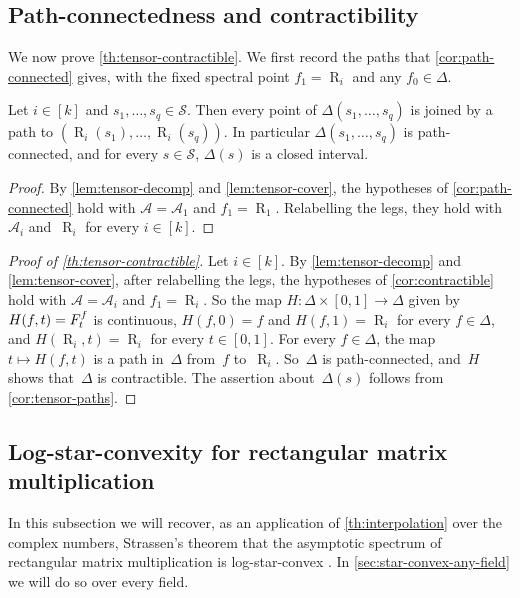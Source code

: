 \documentclass[11pt,letterpaper]{article}
\DeclareMathOperator{\tensorrank}{R}
\begin{document}
\subsection{Path-connectedness and contractibility}\label{sec:tensor-paths}

We now prove \cref{th:tensor-contractible}. We first record the paths that \cref{cor:path-connected} gives, with the fixed spectral point $f_1 = \tensorrank_i$ and any $f_0 \in \Delta$.

\begin{corollary}\label{cor:tensor-paths}
Let $i \in [k]$ and $s_1, \ldots, s_q \in \mathcal{S}$. Then every point of $\Delta(s_1, \ldots, s_q)$ is joined by a path to $(\tensorrank_i(s_1), \ldots, \tensorrank_i(s_q))$. In particular $\Delta(s_1, \ldots, s_q)$ is path-connected, and for every $s \in \mathcal{S}$, $\Delta(s)$ is a closed interval.
\end{corollary}
\begin{proof}
By \cref{lem:tensor-decomp} and \cref{lem:tensor-cover}, the hypotheses of \cref{cor:path-connected} hold with $\mathcal{A} = \mathcal{A}_1$ and $f_1 = \tensorrank_1$. Relabelling the legs, they hold with~$\mathcal{A}_i$ and~$\tensorrank_i$ for every $i \in [k]$.
\end{proof}

\begin{proof}[Proof of \cref{th:tensor-contractible}]
Let $i \in [k]$. By \cref{lem:tensor-decomp} and \cref{lem:tensor-cover}, after relabelling the legs, the hypotheses of \cref{cor:contractible} hold with $\mathcal{A} = \mathcal{A}_i$ and $f_1 = \tensorrank_i$. So the map $H : \Delta \times [0,1] \to \Delta$ given by $H(f,t) = F^{\smash[t]{f}}_t$ is continuous, $H(f,0) = f$ and $H(f,1) = \tensorrank_i$ for every $f \in \Delta$, and $H(\tensorrank_i,t) = \tensorrank_i$ for every $t \in [0,1]$. For every $f \in \Delta$, the map $t \mapsto H(f,t)$ is a path in~$\Delta$ from~$f$ to~$\tensorrank_i$. So~$\Delta$ is path-connected, and~$H$ shows that~$\Delta$ is contractible. The assertion about~$\Delta(s)$ follows from \cref{cor:tensor-paths}.
\end{proof}

\subsection{Log-star-convexity for rectangular matrix multiplication}\label{sec:mm-complex}

In this subsection we will recover, as an application of \cref{th:interpolation} over the complex numbers, Strassen's theorem that the asymptotic spectrum of rectangular matrix multiplication is log-star-convex \cite[Corollary~6.6]{strassen1988asymptotic}. In \cref{sec:star-convex-any-field} we will do so over every field.
\end{document}
